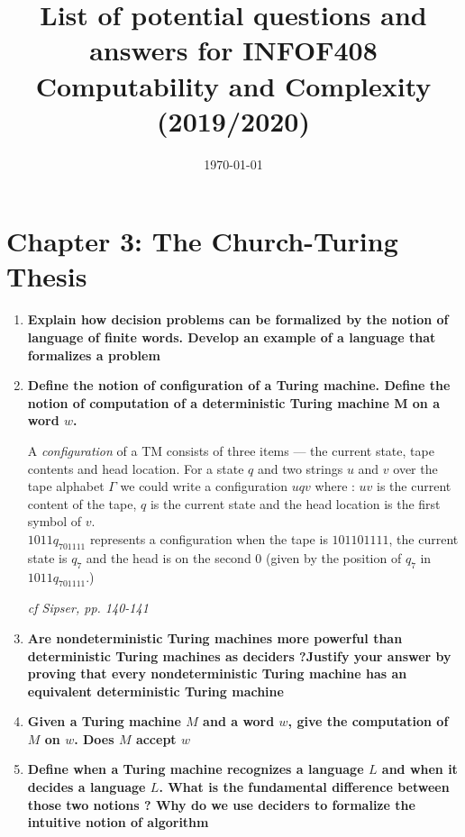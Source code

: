 \documentclass{article}
\title{List of potential questions and answers for INFOF408 Computability and Complexity (2019/2020)}
\date{\today}
\begin{document}
\maketitle
\tableofcontents
\clearpage

\section{Chapter 3: The Church-Turing Thesis}

\begin{enumerate}

\item \textbf{Explain how decision problems can be formalized by the notion of language of finite words. Develop an example of a language that formalizes a problem}

\item \textbf{Define the notion of configuration of a Turing machine. Define the notion of computation of a deterministic Turing machine M on a word $w$.}



A \emph{configuration} of a TM consists of three items --- the current state, tape contents and head location. For a state $q$ and two strings $u$ and $v$ over the tape alphabet $\Gamma$ we could write a configuration $uqv$ where : $uv$ is the current content of the tape, $q$ is the current state and the head location is the first symbol of $v$.\\

$1011q_701111$ represents a configuration when the tape is $101101111$, the current state is $q_7$ and the head is on the second $0$ (given by the position of $q_7$ in $1011q_701111$.)

\emph{cf Sipser, pp. 140-141}




\item \textbf{Are nondeterministic Turing machines more powerful than deterministic Turing machines as deciders ?Justify your answer by proving that every nondeterministic Turing machine has an equivalent deterministic Turing machine}

\item \textbf{Given a Turing machine $M$ and a word $w$, give the computation of $M$ on $w$. Does $M$ accept $w$}

\item \textbf{Define when a Turing machine recognizes a language $L$ and when it decides a language $L$. What is the fundamental difference between those two notions ? Why do we use deciders to formalize the intuitive notion of algorithm}


\end{enumerate}
\end{document}
